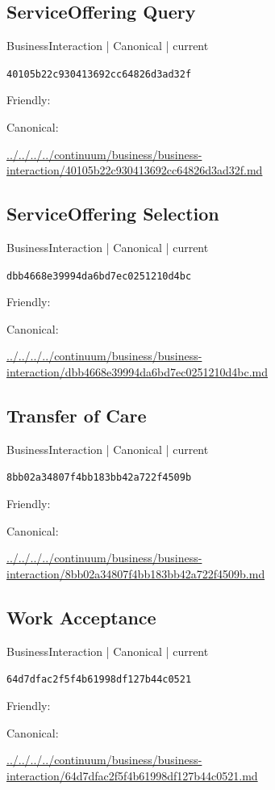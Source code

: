 \documentclass[10pt,a4paper]{article}
\begin{document}
\subsection*{ServiceOffering Query}
{\small BusinessInteraction | Canonical | current}\par
\texttt{40105b22c930413692cc64826d3ad32f}\par
Friendly: \par
Canonical: \par
{\footnotesize\url{../../../../continuum/business/business-interaction/40105b22c930413692cc64826d3ad32f.md}}\par
\subsection*{ServiceOffering Selection}
{\small BusinessInteraction | Canonical | current}\par
\texttt{dbb4668e39994da6bd7ec0251210d4bc}\par
Friendly: \par
Canonical: \par
{\footnotesize\url{../../../../continuum/business/business-interaction/dbb4668e39994da6bd7ec0251210d4bc.md}}\par
\subsection*{Transfer of Care}
{\small BusinessInteraction | Canonical | current}\par
\texttt{8bb02a34807f4bb183bb42a722f4509b}\par
Friendly: \par
Canonical: \par
{\footnotesize\url{../../../../continuum/business/business-interaction/8bb02a34807f4bb183bb42a722f4509b.md}}\par
\subsection*{Work Acceptance}
{\small BusinessInteraction | Canonical | current}\par
\texttt{64d7dfac2f5f4b61998df127b44c0521}\par
Friendly: \par
Canonical: \par
{\footnotesize\url{../../../../continuum/business/business-interaction/64d7dfac2f5f4b61998df127b44c0521.md}}\par
\end{document}
